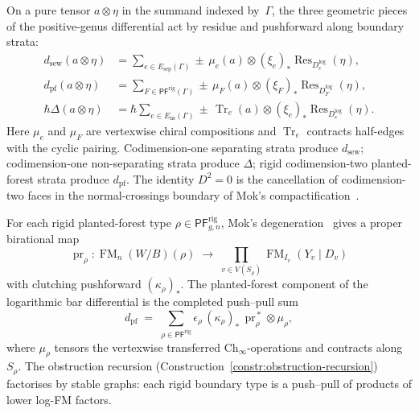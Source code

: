 \begin{construction}
\label{const:vol1-boundary-operators-residue}
On a pure tensor $a\otimes\eta$ in the summand indexed by~$\Gamma$,
the three geometric pieces of the positive-genus differential act
by residue and pushforward along boundary strata:
\begin{align}
 d_{\mathrm{sew}}(a\otimes \eta)
 &=
 \sum_{e\in E_{\mathrm{sep}}(\Gamma)}
 \pm\,\mu_e(a)\otimes
 (\xi_e)_*\operatorname{Res}_{D_e^{\log}}(\eta),
 \label{eq:dsew-residue}\\
 d_{\mathrm{pf}}(a\otimes \eta)
 &=
 \sum_{F\in \mathsf{PF}^{\mathrm{rig}}(\Gamma)}
 \pm\,\mu_F(a)\otimes
 (\xi_F)_*\operatorname{Res}_{D_F^{\log}}(\eta),
 \label{eq:dpf-residue}\\
 \hbar\Delta(a\otimes \eta)
 &=
 \hbar\sum_{e\in E_{\mathrm{ns}}(\Gamma)}
 \pm\,\operatorname{Tr}_e(a)\otimes
 (\xi_e)_*\operatorname{Res}_{D_e^{\log}}(\eta).
 \label{eq:delta-residue}
\end{align}
Here $\mu_e$ and $\mu_F$ are vertexwise chiral compositions and
$\operatorname{Tr}_e$ contracts half-edges with the cyclic pairing.
Codimension-one separating strata produce $d_{\mathrm{sew}}$;
codimension-one non-separating strata produce $\Delta$;
rigid codimension-two planted-forest strata produce
$d_{\mathrm{pf}}$.  The identity $D^2=0$ is the cancellation of
codimension-two faces in the normal-crossings boundary of Mok's
compactification~\cite[Theorem~3.3.1]{Mok25}.
\end{construction}

\begin{construction}
\label{const:vol1-rigid-planted-forest-push-pull}
\label{rem:planted-forest-differential-logfm}
For each rigid planted-forest type
$\rho\in \mathsf{PF}^{\mathrm{rig}}_{g,n}$, Mok's
degeneration~\cite[Cor~5.3.4]{Mok25} gives a proper birational map
\[
\operatorname{pr}_\rho\colon
\operatorname{FM}_n(W/B)(\rho)
\;\longrightarrow\;
\prod_{v\in V(S_\rho)}
\operatorname{FM}_{I_v}(Y_v\mathbin{|}D_v)
\]
with clutching pushforward $(\kappa_\rho)_*$.  The planted-forest
component of the logarithmic bar differential is the completed
push--pull sum
\begin{equation}\label{eq:dpf-logfm}
d_{\mathrm{pf}}
\;=\;
\sum_{\rho\in \mathsf{PF}^{\mathrm{rig}}}
\epsilon_\rho\,
(\kappa_\rho)_*\,\operatorname{pr}_\rho^{\,*}\otimes \mu_\rho,
\end{equation}
where $\mu_\rho$ tensors the vertexwise transferred
$\mathrm{Ch}_\infty$-operations and contracts along $S_\rho$.
The obstruction recursion
(Construction~\ref{constr:obstruction-recursion}) factorises by
stable graphs: each rigid boundary type is a push--pull of products
of lower log-FM factors.
\end{construction}

